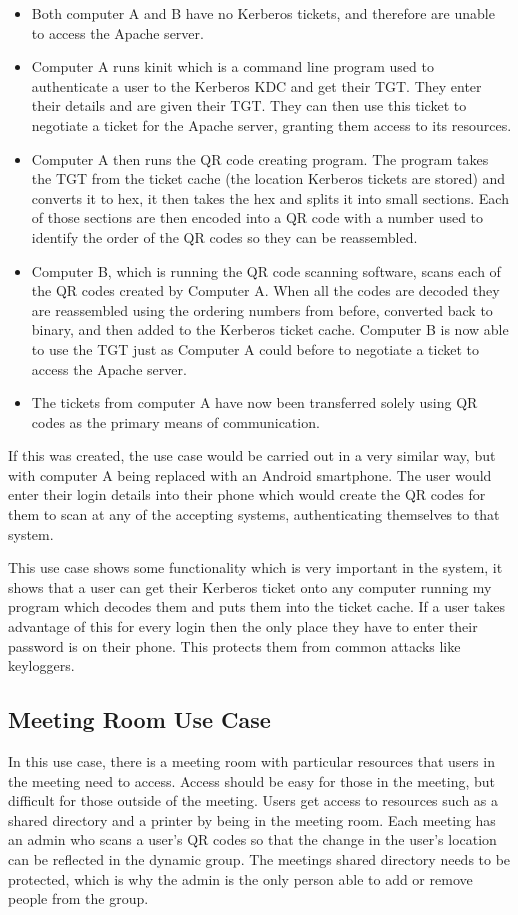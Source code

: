 \documentclass[]{report}   %
\begin{document}
\begin{itemize}
    \item Both computer A and B have no Kerberos tickets, and therefore are unable to access the Apache server.
    \item Computer A runs kinit which is a command line program used to authenticate a user to the Kerberos KDC and get their TGT. They enter their details and are given their TGT. They can then use this ticket to negotiate a ticket for the Apache server, granting them access to its resources.
    \item Computer A then runs the QR code creating program. The program takes the TGT from the ticket cache (the location Kerberos tickets are stored) and converts it to hex, it then takes the hex and splits it into small sections. Each of those sections are then encoded into a QR code with a number used to identify the order of the QR codes so they can be reassembled.
    \item Computer B, which is running the QR code scanning software, scans each of the QR codes created by Computer A. When all the codes are decoded they are reassembled using the ordering numbers from before, converted back to binary, and then added to the Kerberos ticket cache. Computer B is now able to use the TGT just as Computer A could before to negotiate a ticket to access the Apache server.
    \item The tickets from computer A have now been transferred solely using QR codes as the primary means of communication.
\end{itemize}

If this was created, the use case would be carried out in a very similar way, but with computer A being replaced with an Android smartphone. The user would enter their login details into their phone which would create the QR codes for them to scan at any of the accepting systems, authenticating themselves to that system.

This use case shows some functionality which is very important in the system, it shows that a user can get their Kerberos ticket onto any computer running my program which decodes them and puts them into the ticket cache. If a user takes advantage of this for every login then the only place they have to enter their password is on their phone. This protects them from common attacks like keyloggers.

\subsection{Meeting Room Use Case}
In this use case, there is a meeting room with particular resources that users in the meeting need to access. Access should be easy for those in the meeting, but difficult for those outside of the meeting. Users get access to resources such as a shared directory and a printer by being in the meeting room. Each meeting has an admin who scans a user's QR codes so that the change in the user's location can be reflected in the dynamic group. The meetings shared directory needs to be protected, which is why the admin is the only person able to add or remove people from the group.
\end{document}
